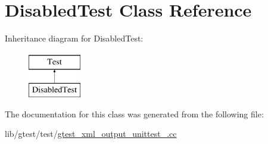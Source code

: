 \hypertarget{class_disabled_test}{\section{Disabled\-Test Class Reference}
\label{class_disabled_test}
}
Inheritance diagram for Disabled\-Test\-:\begin{figure}[H]
\begin{center}
\leavevmode
\includegraphics[height=2.000000cm]{class_disabled_test}
\end{center}
\end{figure}


The documentation for this class was generated from the following file\-:\begin{DoxyCompactItemize}
\item 
lib/gtest/test/\hyperlink{gtest__xml__output__unittest___8cc}{gtest\-\_\-xml\-\_\-output\-\_\-unittest\-\_\-.\-cc}\end{DoxyCompactItemize}

